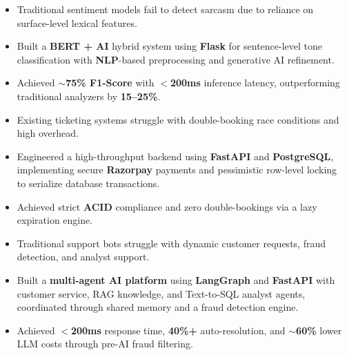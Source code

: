 \documentclass[10pt,a4paper,sans]{moderncv}
\begin{document}
\vspace{0.15cm}

\vspace{-0.3cm}
\begin{itemize}[leftmargin=*, itemsep=2pt, topsep=2pt, parsep=0pt]
  \item Traditional sentiment models fail to detect sarcasm due to reliance on surface-level lexical features.
  \item Built a \textbf{BERT + AI} hybrid system using \textbf{Flask} for sentence-level tone classification with \textbf{NLP}-based preprocessing and generative AI refinement.
  \item Achieved \textbf{$\sim$75\% F1-Score} with \textbf{$<$200ms} inference latency, outperforming traditional analyzers by \textbf{15--25\%}.
\end{itemize}

\vspace{0.15cm}

\vspace{-0.3cm}
\begin{itemize}[leftmargin=*, itemsep=2pt, topsep=2pt, parsep=0pt]
  \item Existing ticketing systems struggle with double-booking race conditions and high overhead.
  \item Engineered a high-throughput backend using \textbf{FastAPI} and \textbf{PostgreSQL}, implementing secure \textbf{Razorpay} payments and pessimistic row-level locking to serialize database transactions.
  \item Achieved strict \textbf{ACID} compliance and zero double-bookings via a lazy expiration engine.
\end{itemize}

\vspace{0.15cm}

\vspace{-0.3cm}
\begin{itemize}[leftmargin=*, itemsep=2pt, topsep=2pt, parsep=0pt]
  \item Traditional support bots struggle with dynamic customer requests, fraud detection, and analyst support.
  \item Built a \textbf{multi-agent AI platform} using \textbf{LangGraph} and \textbf{FastAPI} with customer service, RAG knowledge, and Text-to-SQL analyst agents, coordinated through shared memory and a fraud detection engine.
  \item Achieved \textbf{$<$200ms} response time, \textbf{40\%+} auto-resolution, and \textbf{$\sim$60\%} lower LLM costs through pre-AI fraud filtering.
\end{itemize}
\end{document}
